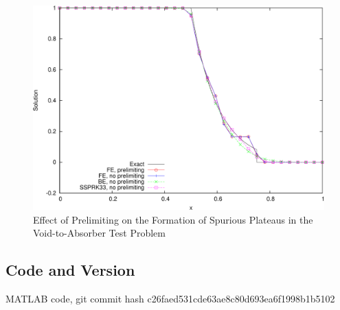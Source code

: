 \begin{figure}[h]
   \centering
   \includegraphics[width=\textwidth]{prelimiting_void_to_absorber/prelimiting.pdf}
   \caption{Effect of Prelimiting on the Formation of Spurious Plateaus
      in the Void-to-Absorber Test Problem}
   \label{fig:prelimiting_void_to_absorber}
\end{figure}
\subsection{Code and Version}
MATLAB code, git commit hash c26faed531cde63ae8c80d693ea6f1998b1b5102
